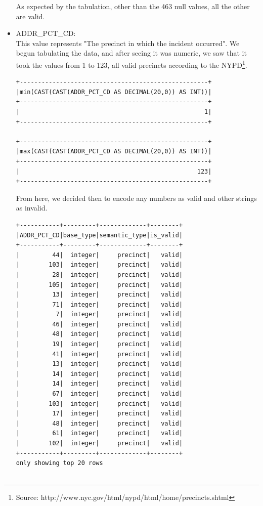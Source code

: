 \documentclass{article}
\begin{document}
\begin{itemize}
As expected by the tabulation, other than the 463 null values, all the other are valid. 

\item ADDR\_PCT\_CD: \\
This value represents "The precinct in which the incident occurred". We begun tabulating the data, and after seeing it was numeric, we saw that it took the values from 1 to 123, all valid precincts according to the NYPD\footnote{Source: http://www.nyc.gov/html/nypd/html/home/precincts.shtml}.

\begin{verbatim}
+----------------------------------------------------+
|min(CAST(CAST(ADDR_PCT_CD AS DECIMAL(20,0)) AS INT))|
+----------------------------------------------------+
|                                                   1|
+----------------------------------------------------+

+----------------------------------------------------+
|max(CAST(CAST(ADDR_PCT_CD AS DECIMAL(20,0)) AS INT))|
+----------------------------------------------------+
|                                                 123|
+----------------------------------------------------+
\end{verbatim}

From here, we decided then to encode any numbers as valid and other strings as invalid. 
\begin{verbatim}
+-----------+---------+-------------+--------+
|ADDR_PCT_CD|base_type|semantic_type|is_valid|
+-----------+---------+-------------+--------+
|         44|  integer|     precinct|   valid|
|        103|  integer|     precinct|   valid|
|         28|  integer|     precinct|   valid|
|        105|  integer|     precinct|   valid|
|         13|  integer|     precinct|   valid|
|         71|  integer|     precinct|   valid|
|          7|  integer|     precinct|   valid|
|         46|  integer|     precinct|   valid|
|         48|  integer|     precinct|   valid|
|         19|  integer|     precinct|   valid|
|         41|  integer|     precinct|   valid|
|         13|  integer|     precinct|   valid|
|         14|  integer|     precinct|   valid|
|         14|  integer|     precinct|   valid|
|         67|  integer|     precinct|   valid|
|        103|  integer|     precinct|   valid|
|         17|  integer|     precinct|   valid|
|         48|  integer|     precinct|   valid|
|         61|  integer|     precinct|   valid|
|        102|  integer|     precinct|   valid|
+-----------+---------+-------------+--------+
only showing top 20 rows


\end{verbatim}
\end{itemize}
\end{document}
